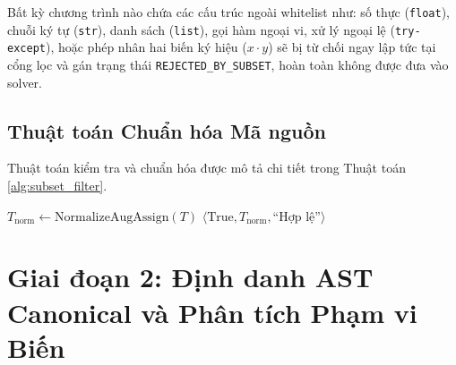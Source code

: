 Bất kỳ chương trình nào chứa các cấu trúc ngoài whitelist như: số thực (\texttt{float}), chuỗi ký tự (\texttt{str}), danh sách (\texttt{list}), gọi hàm ngoại vi, xử lý ngoại lệ (\texttt{try-except}), hoặc phép nhân hai biến ký hiệu ($x \cdot y$) sẽ bị từ chối ngay lập tức tại cổng lọc và gán trạng thái \texttt{REJECTED\_BY\_SUBSET}, hoàn toàn không được đưa vào solver.

\subsection{Thuật toán Chuẩn hóa Mã nguồn}
Thuật toán kiểm tra và chuẩn hóa được mô tả chi tiết trong Thuật toán \ref{alg:subset_filter}.

\begin{algorithm}[H]
\SetAlgoLined
{}
\BlankLine
{}
$T_{\text{norm}} \leftarrow \text{NormalizeAugAssign}(T)$ 
\Return $\langle \text{True}, T_{\text{norm}}, \text{``Hợp lệ''} \rangle$\;
\caption{Thuật toán Lọc và Chuẩn hóa Tập con An toàn (Safe Subset Filter)}
\label{alg:subset_filter}
\end{algorithm}

\section{Giai đoạn 2: Định danh AST Canonical và Phân tích Phạm vi Biến}
\label{sec:ast_canonicalization}

